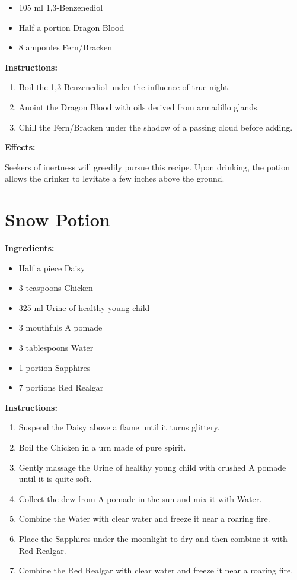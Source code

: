 \documentclass{article}
\begin{document}
\begin{itemize}
  \item 105 ml 1,3-Benzenediol
  \item Half a portion Dragon Blood
  \item 8 ampoules Fern/Bracken
\end{itemize}

\textbf{Instructions:}

\begin{enumerate}
  \item Boil the 1,3-Benzenediol under the influence of true night.
  \item Anoint the Dragon Blood with oils derived from armadillo glands.
  \item Chill the Fern/Bracken under the shadow of a passing cloud before adding.
\end{enumerate}

\textbf{Effects:}

Seekers of inertness will greedily pursue this recipe. Upon drinking, the potion allows the drinker to levitate a few inches above the ground.

\newpage
\section*{Snow Potion}

\textbf{Ingredients:}

\begin{itemize}
  \item Half a piece Daisy
  \item 3 teaspoons Chicken
  \item 325 ml Urine of healthy young child
  \item 3 mouthfuls A pomade
  \item 3 tablespoons Water
  \item 1 portion Sapphires
  \item 7 portions Red Realgar
\end{itemize}

\textbf{Instructions:}

\begin{enumerate}
  \item Suspend the Daisy above a flame until it turns glittery.
  \item Boil the Chicken in a urn made of pure spirit.
  \item Gently massage the Urine of healthy young child with crushed A pomade until it is quite soft.
  \item Collect the dew from A pomade in the sun and mix it with Water.
  \item Combine the Water with clear water and freeze it near a roaring fire.
  \item Place the Sapphires under the moonlight to dry and then combine it with Red Realgar.
  \item Combine the Red Realgar with clear water and freeze it near a roaring fire.
\end{enumerate}
\end{document}
